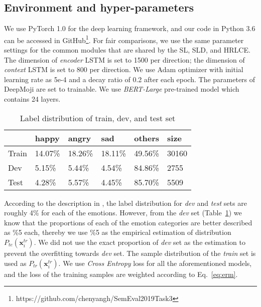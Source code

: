 \documentclass[11pt,a4paper]{article}
\begin{document}
\subsection{Environment and hyper-parameters}
We use PyTorch 1.0 for the deep learning framework, and our code in Python 3.6 can be accessed in GitHub\footnote{https://github.com/chenyangh/SemEval2019Task3}.
For fair comparisons, we use the same parameter settings for the common modules that are shared by the SL, SLD, and HRLCE. The dimension of \emph{encoder} LSTM is set to 1500 per direction; the dimension of \emph{context} LSTM is set to 800 per direction. We use Adam optimizer with initial learning rate as 5e-4 and a decay ratio of 0.2 after each epoch. 
The parameters of DeepMoji are set to trainable. We use \textit{BERT-Large} pre-trained model which contains 24 layers. 


\begin{table}[h]
\centering
    \setlength\tabcolsep{2.7pt}
    \begin{tabular}{l|llll|l} \hline  \hline
              & happy   & angry   & sad     & others   & size   \\  \hline
        Train & 14.07\% & 18.26\% & 18.11\% & 49.56\%  & 30160  \\
        Dev   & 5.15\%  & 5.44\%  & 4.54\%  & 84.86\%  & 2755 \\
        Test  & 4.28\%  & 5.57\%  & 4.45\%  & 85.70\%  & 5509 \\  \hline \hline
    \end{tabular}
\caption{Label distribution of train, dev, and test set}
    \label{tab:data_dist}
\end{table}


According to the description in \cite{competition}, the label distribution for \textit{dev} and \textit{test} sets are roughly 4\% for each of the emotions. However, from the \textit{dev} set (Table~\ref{tab:data_dist}) we know that the proportions of each of the emotion categories are better described as \%5 each, thereby we use \%5 as the empirical estimation of distribution $P_{te}(\bm{x}_{i}^{tr})$. We did not use the exact proportion of \textit{dev} set as the estimation to prevent the overfitting towards \textit{dev} set. The sample distribution of the \textit{train} set is used as $P_{tr}(\bm{x}_i^{tr})$. We use \emph{Cross Entropy} loss for all the aforementioned models, and the loss of the training samples are weighted according to Eq.~\ref{eq:erm}.
\end{document}
